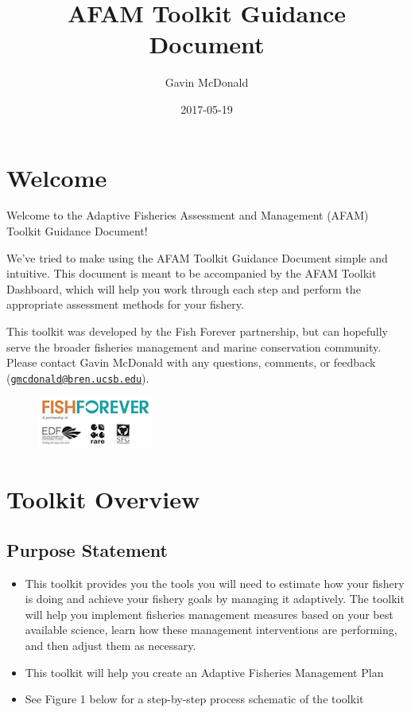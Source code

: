 \documentclass[]{book}
\title{AFAM Toolkit Guidance Document}
\author{Gavin McDonald}
\date{2017-05-19}
\begin{document}
\maketitle

{
\setcounter{tocdepth}{1}
\tableofcontents
}
\chapter*{Welcome}\label{welcome}

Welcome to the Adaptive Fisheries Assessment and Management (AFAM)
Toolkit Guidance Document!

We've tried to make using the AFAM Toolkit Guidance Document simple and
intuitive. This document is meant to be accompanied by the AFAM Toolkit
Dashboard, which will help you work through each step and perform the
appropriate assessment methods for your fishery.

This toolkit was developed by the Fish Forever partnership, but can
hopefully serve the broader fisheries management and marine conservation
community. Please contact Gavin McDonald with any questions, comments,
or feedback
(\href{mailto:gmcdonald@bren.ucsb.edu}{\nolinkurl{gmcdonald@bren.ucsb.edu}}).

\begin{figure}
\centering
\includegraphics{myMediaFolder/media/FF_Logo.png}
\caption{}
\end{figure}

\chapter*{Toolkit Overview}\label{toolkit-overview}

\section{Purpose Statement}\label{purpose-statement}

\begin{itemize}
\item
  This toolkit provides you the tools you will need to estimate how your
  fishery is doing and achieve your fishery goals by managing it
  adaptively. The toolkit will help you implement fisheries management
  measures based on your best available science, learn how these
  management interventions are performing, and then adjust them as
  necessary.
\item
  This toolkit will help you create an Adaptive Fisheries Management
  Plan
\item
  See Figure 1 below for a step-by-step process schematic of the toolkit
\end{itemize}
\end{document}
